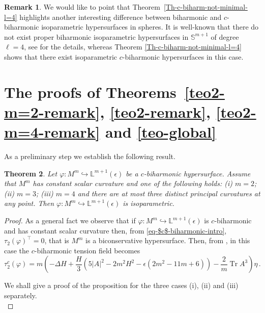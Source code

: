\documentclass[11pt,leqno]{amsart}
\theoremstyle{plain}
\newtheorem{theorem}                {Theorem}      [section]
\theoremstyle{definition}
\newtheorem{remark}       [theorem]  {Remark}
\numberwithin{equation}{section}
\def \s{{\mathbb S}}
\DeclareMathOperator{\trace}{Tr}
\numberwithin{equation}{section}
\begin{document}
{\begin{remark}
We would like to point that Theorem~\ref{Th-c-biharm-not-minimal-l=4} highlights another interesting
difference between biharmonic and $c$-biharmonic isoparametric hypersurfaces in spheres. It is well-known that there do not exist proper biharmonic isoparametric hypersurfaces in $\s^{m+1}$ of degree \(\ell=4\), see \cite{MR2943022} for the details,
whereas Theorem \ref{Th-c-biharm-not-minimal-l=4} shows that there exist isoparametric $c$-biharmonic  hypersurfaces in this case.
\end{remark}
 
 \section{The proofs of Theorems~\ref{teo2-m=2-remark}, \ref{teo2-remark}, \ref{teo2-m=4-remark} and \ref{teo-global}}\label{sec-new-remark}
 
As a preliminary step we establish the following result.
 
 \begin{theorem}\label{teo1-remark}
Let $\varphi: M^m \hookrightarrow \mathbb{L}^{m+1}(\epsilon)$ be a $c$-biharmonic hypersurface. Assume that $M^m$ has constant scalar curvature and one of the following holds: {\rm (i)} $m=2$; {\rm (ii)} $m=3$; {\rm (iii)} $m=4$ and there are at most three distinct principal curvatures at any point. Then $\varphi: M^m \hookrightarrow \mathbb{L}^{m+1}(\epsilon)$  is isoparametric.
\end{theorem}
\begin{proof} As a general fact we observe that if $\varphi: M^m \hookrightarrow \mathbb{L}^{m+1}(\epsilon)$ is $c$-biharmonic and has constant scalar curvature then,  from \eqref{eq-$c$-biharmonic-intro},  $\tau_2(\varphi)^{\top}=0$, that is $M^m$ is a biconservative hypersurface. Then, from \cite[Equation~(3.3)]{arXiv:2311.04493}, in this case the $c$-biharmonic tension field becomes
\begin{equation}\label{eq:taucbicconstscalar}
\tau_2^c(\varphi)= m \left(-\Delta H+\frac{H}{3}\left(5|A|^2-2 m^2 H^2-\epsilon\left(2 m^2-11 m+6\right)\right)-\frac{2}{m} \trace A^3\right) \eta\,.
\end{equation}


We shall give a proof of the proposition for the three cases (i), (ii) and (iii) separately. \\


\end{proof}}
\end{document}
